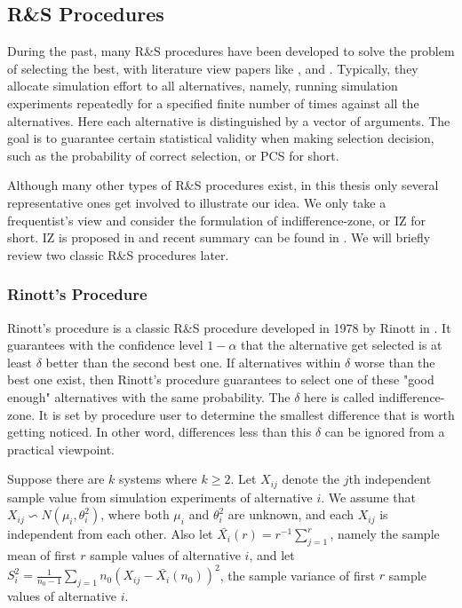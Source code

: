 \documentclass[12pt,a4paper]{report}
\begin{document}
\subsection{R\&S Procedures}

During the past, many R\&S procedures have been developed to solve the problem of selecting the best, with literature view papers like \cite{ras-recent-advances}, \cite{ehiorams06ras} and \cite{ms05ras}. Typically, they allocate simulation effort to all alternatives, namely, running simulation experiments repeatedly for a specified finite number of times against all the alternatives. Here each alternative is distinguished by a vector of arguments. The goal is to guarantee certain statistical validity when making selection decision, such as the probability of correct selection, or PCS for short.

Although many other types of R\&S procedures exist, in this thesis only several representative ones get involved to illustrate our idea. We only take a frequentist’s view and consider the formulation of indifference-zone, or IZ for short. IZ is proposed in \cite{toams1954iz} and recent summary can be found in \cite{nyjws95iz}. We will briefly review two classic R\&S procedures later.

\subsubsection{Rinott's Procedure}

Rinott's procedure is a classic R\&S procedure developed in 1978 by Rinott in \cite{cistam1978rinott}. It guarantees with the confidence level $1 - \alpha$ that the alternative get selected is at least $\delta$ better than the second best one. If alternatives within $\delta$ worse than the best one exist, then Rinott's procedure guarantees to select one of these "good enough" alternatives with the same probability. The $\delta$ here is called indifference-zone. It is set by procedure user to determine the smallest difference that is worth getting noticed. In other word, differences less than this $\delta$ can be ignored from a practical viewpoint.

Suppose there are $k$ systems where $k \geqslant 2$. Let $X_{ij}$ denote the $j$th independent sample value from simulation experiments of alternative $i$. We assume that $X_{ij} \backsim N(\mu_i, \theta_i^2)$, where both $\mu_i$ and $\theta_i^2$ are unknown, and each $X_{ij}$ is independent from each other. Also let $\bar{X_i}(r) = r^{-1}\sum_{j=1}^r$, namely the sample mean of first $r$ sample values of alternative $i$, and let $S_i^2 = \frac{1}{n_0 - 1}\sum_{j=1}{n_0}(X_{ij} - \bar{X_i}(n_0))^2$, the sample variance of first $r$ sample values of alternative $i$.
\end{document}

